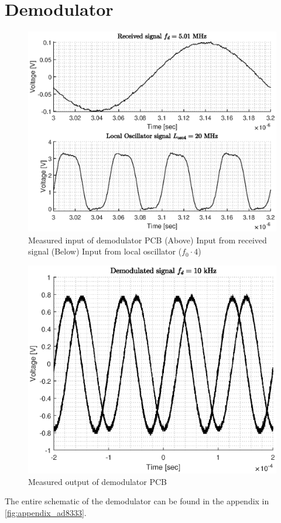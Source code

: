 \section{Demodulator}
\begin{figure}[htbp]
	\centering
	\includegraphics[width=.8\textwidth]{Figures/4_demod_pcb_in.eps}
	\caption[Measured input of demodulator PCB]{Measured input of demodulator PCB (Above) Input from received signal (Below) Input from local oscillator ($f_{0}\cdot4$)}
	\label{fig:4_demod_in}
\end{figure}
\begin{figure}[htbp]
	\centering
	\includegraphics[width=.8\textwidth]{Figures/4_demod_pcb_out.eps}
	\caption[Measured output of demodulator PCB]{Measured output of demodulator PCB}
	\label{fig:4_demod_out}
\end{figure}
The entire schematic of the demodulator can be found in the appendix in \cref{fig:appendix_ad8333}.
